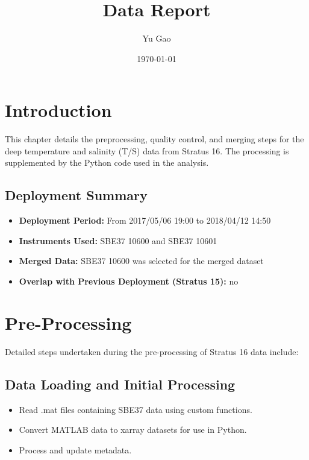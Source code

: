 \documentclass[11pt]{article}
\title{\displayprojectname{} \casenumber{} Data Report}
\author{Yu Gao}
\date{\today}
\newcommand{\displayprojectname}{Stratus}
\newcommand{\casenumber}{16}  %
\newcommand{\previouscasenumber}{15}  %
\newcommand{\HasNextDeploymentOverlap}{no}  %
\newcommand{\FirstInstrumentType}{SBE37}  %
\newcommand{\SecondInstrumentType}{SBE37}  %
\newcommand{\DeploymentSpike}{2017/05/06 19:00} %
\newcommand{\RecoverySpike}{2018/04/12 14:50} %
\newcommand{\FirstInstrument}{10600}
\newcommand{\SecondInstrument}{10601}
\newcommand{\CurrentDeploymentInstrument}{\FirstInstrumentType{} \FirstInstrument}  %
\begin{document}
\maketitle
\tableofcontents
\newpage


\section{Introduction}
This chapter details the preprocessing, quality control, 
and merging steps for the deep temperature and salinity (T/S) data from \displayprojectname{} \casenumber{}.
The processing is supplemented by the Python code used in the analysis.

\subsection{Deployment Summary}
\begin{itemize}
    \item \textbf{Deployment Period:} From \DeploymentSpike{} to \RecoverySpike{}
    \item \textbf{Instruments Used:} \FirstInstrumentType{} \FirstInstrument{} and \SecondInstrumentType{} \SecondInstrument{}
    \item \textbf{Merged Data:} \CurrentDeploymentInstrument{} was selected for the merged dataset
    \item \textbf{Overlap with Previous Deployment (\displayprojectname{} \previouscasenumber{}):} \HasNextDeploymentOverlap{}
\end{itemize}

\section{Pre-Processing}
Detailed steps undertaken during the pre-processing of \displayprojectname{} \casenumber{} data include:

\subsection{Data Loading and Initial Processing}
\begin{itemize}
\item Read .mat files containing \FirstInstrumentType{} data using custom functions.
\item Convert MATLAB data to xarray datasets for use in Python.
\item Process and update metadata.
\end{itemize}
\end{document}
